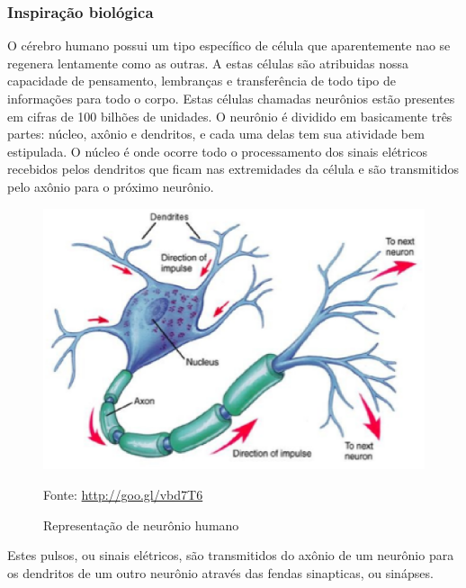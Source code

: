 \subsubsection{Inspiração biológica}

    O cérebro humano possui um tipo específico de célula que aparentemente nao se regenera lentamente como as outras. A estas células são atribuidas nossa capacidade de pensamento, lembranças e transferência de todo tipo de informações para todo o corpo. Estas células chamadas neurônios estão presentes em cifras de 100 bilhões de unidades. \cite{anderson1992artificial}
    O neurônio é dividido em basicamente três partes: núcleo, axônio e dendritos, e cada uma delas tem sua atividade bem estipulada. O núcleo é onde ocorre todo o processamento dos sinais elétricos recebidos pelos dendritos que ficam nas extremidades da célula e são transmitidos pelo axônio para o próximo neurônio.

    \begin{figure}[ht]
        \centering
        \label{fig01}
            \includegraphics[keepaspectratio=true, scale=0.4]{editaveis/images/neuronio.eps}
        \caption{Representação de neurônio humano}
        Fonte: \url{http://goo.gl/vbd7T6}
    \end{figure}

    Estes pulsos, ou sinais elétricos, são transmitidos do axônio de um neurônio para os dendritos de um outro neurônio através das fendas sinapticas, ou sinápses.

